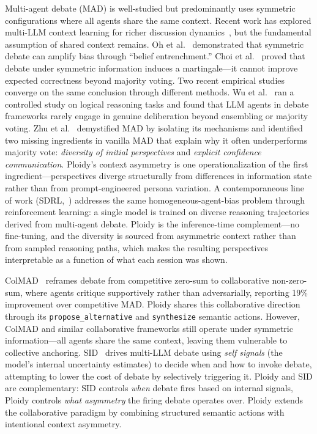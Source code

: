 \documentclass[11pt]{article}
\begin{document}
Multi-agent debate (MAD) is well-studied but predominantly uses symmetric configurations where all agents share the same context. Recent work has explored multi-LLM context learning for richer discussion dynamics~\citep{m2cl2026}, but the fundamental assumption of shared context remains. Oh et al.~\citep{oh2025dreamad} demonstrated that symmetric debate can amplify bias through ``belief entrenchment.'' Choi et al.~\citep{choi2025debate} proved that debate under symmetric information induces a martingale---it cannot improve expected correctness beyond majority voting. Two recent empirical studies converge on the same conclusion through different methods. Wu et al.~\citep{wu2025reallydebate} ran a controlled study on logical reasoning tasks and found that LLM agents in debate frameworks rarely engage in genuine deliberation beyond ensembling or majority voting. Zhu et al.~\citep{zhu2026demystifying} demystified MAD by isolating its mechanisms and identified two missing ingredients in vanilla MAD that explain why it often underperforms majority vote: \emph{diversity of initial perspectives} and \emph{explicit confidence communication}. Ploidy's context asymmetry is one operationalization of the first ingredient---perspectives diverge structurally from differences in information state rather than from prompt-engineered persona variation. A contemporaneous line of work (SDRL,~\citep{sdrl2026}) addresses the same homogeneous-agent-bias problem through reinforcement learning: a single model is trained on diverse reasoning trajectories derived from multi-agent debate. Ploidy is the inference-time complement---no fine-tuning, and the diversity is sourced from asymmetric context rather than from sampled reasoning paths, which makes the resulting perspectives interpretable as a function of what each session was shown.

ColMAD~\citep{chen2025colmad} reframes debate from competitive zero-sum to collaborative non-zero-sum, where agents critique supportively rather than adversarially, reporting 19\% improvement over competitive MAD. Ploidy shares this collaborative direction through its \texttt{propose\_alternative} and \texttt{synthesize} semantic actions. However, ColMAD and similar collaborative frameworks still operate under symmetric information---all agents share the same context, leaving them vulnerable to collective anchoring. SID~\citep{chen2025sid} drives multi-LLM debate using \emph{self signals} (the model's internal uncertainty estimates) to decide when and how to invoke debate, attempting to lower the cost of debate by selectively triggering it. Ploidy and SID are complementary: SID controls \emph{when} debate fires based on internal signals, Ploidy controls \emph{what asymmetry} the firing debate operates over. Ploidy extends the collaborative paradigm by combining structured semantic actions with intentional context asymmetry.
\end{document}
